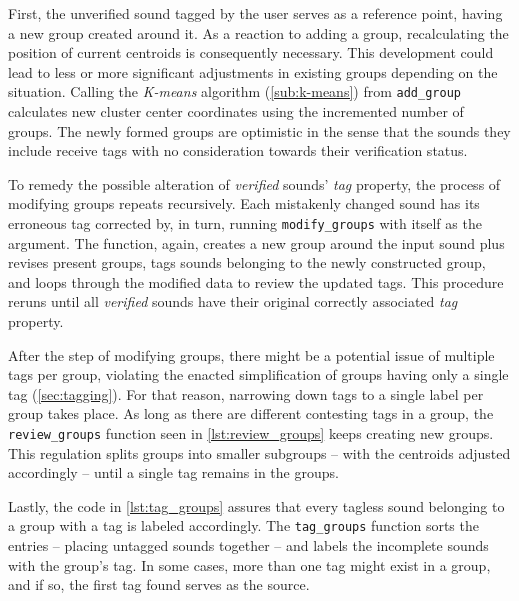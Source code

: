 First, the unverified sound tagged by the user serves as a reference point, having a new group created around it. As a reaction to adding a group, recalculating the position of current centroids is consequently necessary. This development could lead to less or more significant adjustments in existing groups depending on the situation. Calling the \emph{K-means} algorithm (\cref{sub:k-means}) from \texttt{add\_group} calculates new cluster center coordinates using the incremented number of groups. The newly formed groups are optimistic in the sense that the sounds they include receive tags with no consideration towards their verification status.

To remedy the possible alteration of \emph{verified} sounds' \emph{tag} property, the process of modifying groups repeats recursively. Each mistakenly changed sound has its erroneous tag corrected by, in turn, running \texttt{modify\_groups} with itself as the argument. The function, again, creates a new group around the input sound plus revises present groups, tags sounds belonging to the newly constructed group, and loops through the modified data to review the updated tags. This procedure reruns until all \emph{verified} sounds have their original correctly associated \emph{tag} property.

After the step of modifying groups, there might be a potential issue of multiple tags per group, violating the enacted simplification of groups having only a single tag (\cref{sec:tagging}). For that reason, narrowing down tags to a single label per group takes place. As long as there are different contesting tags in a group, the \texttt{review\_groups} function seen in \cref{lst:review_groups} keeps creating new groups. This regulation splits groups into smaller subgroups – with the centroids adjusted accordingly – until a single tag remains in the groups.
\begin{mdframed}[style=code]
    
\end{mdframed}

Lastly, the code in \cref{lst:tag_groups} assures that every tagless sound belonging to a group with a tag is labeled accordingly. The \texttt{tag\_groups} function sorts the entries – placing untagged sounds together – and labels the incomplete sounds with the group's tag. In some cases, more than one tag might exist in a group, and if so, the first tag found serves as the source.
\begin{mdframed}[style=code]
    
\end{mdframed}


